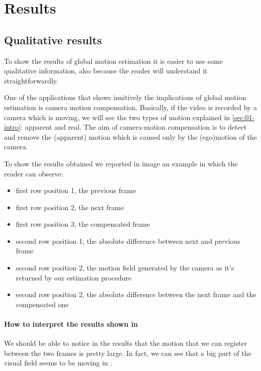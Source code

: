 \section{Results}
\label{sec:04-results}

\subsection{Qualitative results}

To show the results of global motion estimation it is easier to use some qualitative information, also because the reader will understand it straightforwardly.

One of the applications that shows inuitively the implications of global motion estimation is camera motion compensation. 
Basically, if the video is recorded by a camera which is moving, we will see the two types of motion explained in \cref{sec:01-intro}: apparent and real. The aim of camera-motion compensation is to detect and remove the (apparent) motion which is caused only by the (ego)motion of the camera.

To show the results obtained we reported in image  an example in which the reader can observe:
\begin{itemize}[noitemsep]
    \item first row position 1, the previous frame 
    \item first row position 2, the next frame 
    \item first row position 3, the compensated frame 
    \item second row position 1, the absolute difference between next and previous frame
    \item second row position 2, the motion field generated by the camera as it's returned by our estimation procedure
    \item second row position 2, the absolute difference between the next frame and the compensated one 
\end{itemize}


\paragraph{How to interpret the results shown in } We should be able to notice in the results that the motion that we can register between the two frames is pretty large. In fact, we can see that a big part of the visual field seems to be moving in .

